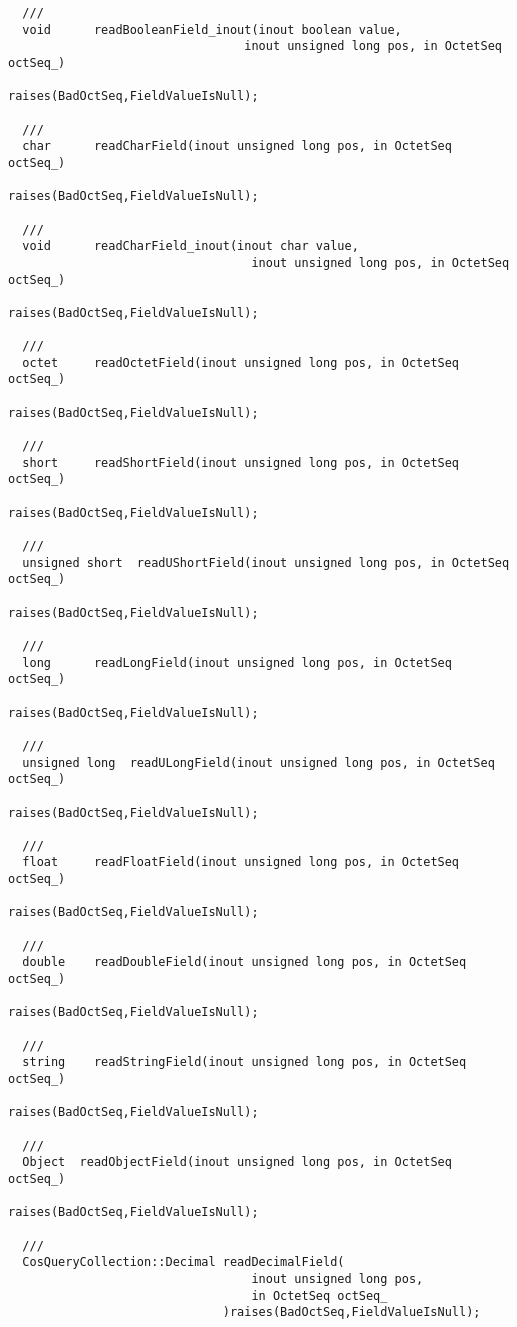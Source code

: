 \documentclass[10pt]{article}
\begin{document}
\begin{verbatim}
  ///
  void      readBooleanField_inout(inout boolean value,
                                 inout unsigned long pos, in OctetSeq octSeq_)
                                          raises(BadOctSeq,FieldValueIsNull);

  ///
  char      readCharField(inout unsigned long pos, in OctetSeq octSeq_)
                                          raises(BadOctSeq,FieldValueIsNull);

  ///
  void      readCharField_inout(inout char value,
                                  inout unsigned long pos, in OctetSeq octSeq_)
                                          raises(BadOctSeq,FieldValueIsNull);

  ///
  octet     readOctetField(inout unsigned long pos, in OctetSeq octSeq_)
                                         raises(BadOctSeq,FieldValueIsNull);

  ///
  short     readShortField(inout unsigned long pos, in OctetSeq octSeq_) 
                                         raises(BadOctSeq,FieldValueIsNull);

  ///
  unsigned short  readUShortField(inout unsigned long pos, in OctetSeq octSeq_) 
                                        raises(BadOctSeq,FieldValueIsNull);

  ///
  long      readLongField(inout unsigned long pos, in OctetSeq octSeq_)
                                         raises(BadOctSeq,FieldValueIsNull);

  ///
  unsigned long  readULongField(inout unsigned long pos, in OctetSeq octSeq_)
                                          raises(BadOctSeq,FieldValueIsNull);

  ///
  float     readFloatField(inout unsigned long pos, in OctetSeq octSeq_)
                                          raises(BadOctSeq,FieldValueIsNull);

  ///
  double    readDoubleField(inout unsigned long pos, in OctetSeq octSeq_)
                                          raises(BadOctSeq,FieldValueIsNull);

  ///
  string    readStringField(inout unsigned long pos, in OctetSeq octSeq_)
                                          raises(BadOctSeq,FieldValueIsNull);

  ///
  Object  readObjectField(inout unsigned long pos, in OctetSeq octSeq_)
                                          raises(BadOctSeq,FieldValueIsNull);

  ///
  CosQueryCollection::Decimal readDecimalField(
                                  inout unsigned long pos,
                                  in OctetSeq octSeq_
                              )raises(BadOctSeq,FieldValueIsNull);
  

\end{verbatim}
\end{document}

